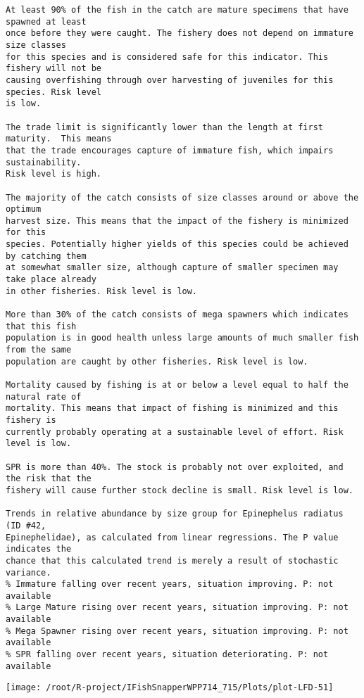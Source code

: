 \documentclass{report}\usepackage[]{graphicx}\usepackage[]{color}
\makeatletter
\def\maxwidth{ %
  \ifdim\Gin@nat@width>\linewidth
    \linewidth
  \else
    \Gin@nat@width
  \fi
}
\newenvironment{kframe}{%
 \def\at@end@of@kframe{}%
 \ifinner\ifhmode%
  \def\at@end@of@kframe{\end{minipage}}%
  \begin{minipage}{\columnwidth}%
 \fi\fi%
 \def\FrameCommand##1{\hskip\@totalleftmargin \hskip-\fboxsep
 \colorbox{shadecolor}{##1}\hskip-\fboxsep
     \hskip-\linewidth \hskip-\@totalleftmargin \hskip\columnwidth}%
 \MakeFramed {\advance\hsize-\width
   \@totalleftmargin\z@ \linewidth\hsize
   \@setminipage}}%
 {\par\unskip\endMakeFramed%
 \at@end@of@kframe}
\newenvironment{knitrout}{}{} %
\makeatother
\begin{document}
\begin{knitrout}
\begin{kframe}
\begin{verbatim}
At least 90% of the fish in the catch are mature specimens that have spawned at least
once before they were caught. The fishery does not depend on immature size classes
for this species and is considered safe for this indicator. This fishery will not be
causing overfishing through over harvesting of juveniles for this species. Risk level
is low.

The trade limit is significantly lower than the length at first maturity.  This means
that the trade encourages capture of immature fish, which impairs sustainability.
Risk level is high.

The majority of the catch consists of size classes around or above the optimum
harvest size. This means that the impact of the fishery is minimized for this
species. Potentially higher yields of this species could be achieved by catching them
at somewhat smaller size, although capture of smaller specimen may take place already
in other fisheries. Risk level is low.

More than 30% of the catch consists of mega spawners which indicates that this fish
population is in good health unless large amounts of much smaller fish from the same
population are caught by other fisheries. Risk level is low.
 
Mortality caused by fishing is at or below a level equal to half the natural rate of
mortality. This means that impact of fishing is minimized and this fishery is
currently probably operating at a sustainable level of effort. Risk level is low.
 
SPR is more than 40%. The stock is probably not over exploited, and the risk that the
fishery will cause further stock decline is small. Risk level is low.
 
Trends in relative abundance by size group for Epinephelus radiatus (ID #42,
Epinephelidae), as calculated from linear regressions. The P value indicates the
chance that this calculated trend is merely a result of stochastic variance.
% Immature falling over recent years, situation improving. P: not available
% Large Mature rising over recent years, situation improving. P: not available
% Mega Spawner rising over recent years, situation improving. P: not available
% SPR falling over recent years, situation deteriorating. P: not available
\end{verbatim}
\end{kframe}
\texttt{[image: /root/R-project/IFishSnapperWPP714\_715/Plots/plot-LFD-51]} 


\end{knitrout}
\end{document}
